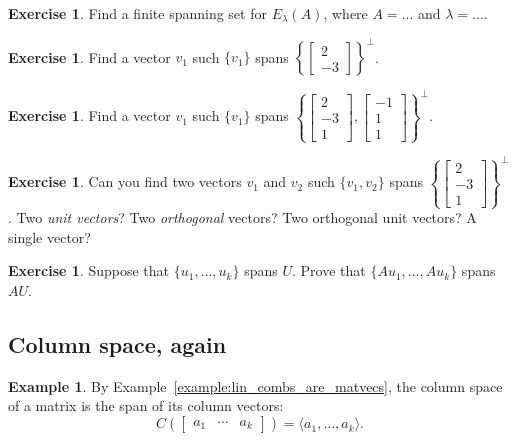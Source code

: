 \documentclass[fullpage]{amsart}
\theoremstyle{definition}
\newtheorem{example}[theorem]{Example}
\newtheorem{exercise}[theorem]{Exercise}
\begin{document}
\begin{exercise}
Find a finite spanning set for $E_\lambda(A)$, where $A=...$ and $\lambda=...$.
\end{exercise}

\begin{exercise}
Find a vector $v_1$ such $\{v_1\}$ spans $\left\{\begin{bmatrix}2\\-3\end{bmatrix}\right\}^\perp$.
\end{exercise}

\begin{exercise}
Find a vector $v_1$ such $\{v_1\}$ spans
$\left\{\begin{bmatrix}2\\-3\\1\end{bmatrix},
  \begin{bmatrix}-1\\1\\1\end{bmatrix}\right\}^\perp$.
  \end{exercise}

\begin{exercise}
Can you find two vectors $v_1$ and $v_2$ such $\{v_1, v_2\}$ spans
$\left\{\begin{bmatrix}2\\-3\\1\end{bmatrix}
  \right\}^\perp$. Two \emph{unit vectors}? Two \emph{orthogonal} vectors? Two orthogonal unit vectors? A single vector?
\end{exercise}

\begin{exercise}
  Suppose that $\{u_1,\ldots,u_k\}$ spans $U$. Prove that $\{Au_1,\ldots,Au_k\}$ spans $AU$.
\end{exercise}

\subsection{Column space, again}
\begin{example}
  By Example~\ref{example:lin_combs_are_matvecs}, the column space of a matrix is the span of its column vectors:
  $$
  C\left(\begin{bmatrix}a_1&\cdots&a_k\end{bmatrix}\right) = \langle a_1,\ldots,a_k \rangle.
  $$
\end{example}
\end{document}
